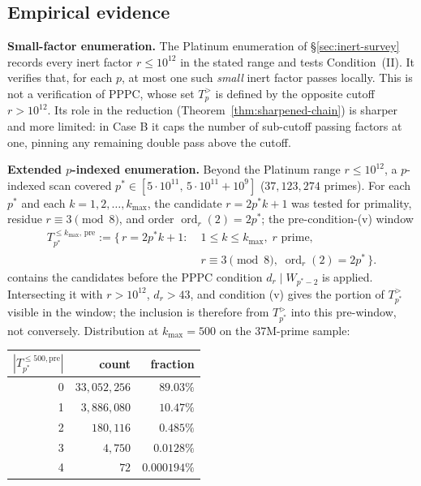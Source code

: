 \documentclass[11pt]{amsart}
\theoremstyle{plain}
\theoremstyle{definition}
\theoremstyle{remark}
\numberwithin{equation}{section}
\newcommand{\ord}{\operatorname{ord}}
\begin{document}
\subsection{Empirical evidence}\label{sec:empirical}

\textbf{Small-factor enumeration.} The Platinum enumeration of \S\ref{sec:inert-survey} records every inert factor $r \leq 10^{12}$ in the stated range and tests Condition~(II). It verifies that, for each $p$, at most one such \emph{small} inert factor passes locally. This is not a verification of PPPC, whose set $T_p^{>}$ is defined by the opposite cutoff $r>10^{12}$. Its role in the reduction (Theorem~\ref{thm:sharpened-chain}) is sharper and more limited: in Case B it caps the number of sub-cutoff passing factors at one, pinning any remaining double pass above the cutoff.

\textbf{Extended $p$-indexed enumeration.} Beyond the Platinum range $r \leq 10^{12}$, a $p$-indexed scan covered $p^\ast \in [5 \cdot 10^{11},\, 5 \cdot 10^{11} + 10^9]$ ($37{,}123{,}274$ primes). For each $p^\ast$ and each $k = 1, 2, \dots, k_{\max}$, the candidate $r = 2 p^\ast k + 1$ was tested for primality, residue $r \equiv 3 \pmod 8$, and order $\ord_r(2) = 2 p^\ast$; the pre-condition-(v) window
\[
  \begin{aligned}
  T_{p^\ast}^{\leq k_{\max},\,\mathrm{pre}} := \{\,r = 2 p^\ast k + 1 :\;& 1 \leq k \leq k_{\max},\; r \text{ prime},\\
  & r \equiv 3 \pmod 8,\; \ord_r(2) = 2 p^\ast\,\}.
  \end{aligned}
\]
contains the candidates before the PPPC condition $d_r \mid W_{p^\ast-2}$ is applied. Intersecting it with $r>10^{12}$, $d_r>43$, and condition (v) gives the portion of $T_{p^\ast}^{>}$ visible in the window; the inclusion is therefore from $T_{p^\ast}^{>}$ into this pre-window, not conversely. Distribution at $k_{\max} = 500$ on the $37$M-prime sample:

\begin{center}
\begin{tabular}{r r r}
\hline
$|T_{p^\ast}^{\leq 500,\mathrm{pre}}|$ & count & fraction \\
\hline
0 & $33{,}052{,}256$ & $89.03\%$ \\
1 & $3{,}886{,}080$ & $10.47\%$ \\
2 & $180{,}116$ & $0.485\%$ \\
3 & $4{,}750$ & $0.0128\%$ \\
4 & $72$ & $0.000194\%$ \\
\hline
\end{tabular}
\end{center}
\end{document}
